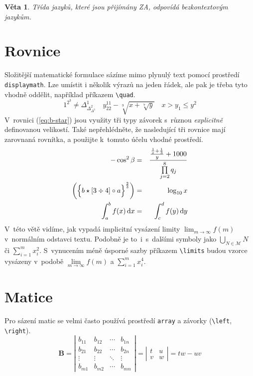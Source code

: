 \documentclass[a4paper, twocolumn, 11pt]{article}
\theoremstyle{plain}
\newtheorem{theorem}{Věta}
\begin{document}
\begin{theorem}

	Třída jazyků, které jsou přijímány ZA, odpovídá \emph{bezkontextovým jazykům.}

\end{theorem}

\section{Rovnice}

Složitější matematické formulace sázíme mimo plynulý text pomocí prostředí \texttt{displaymath}.
Lze umístit i několik výrazů na jeden řádek, ale pak je třeba tyto vhodně oddělit,
například příkazem \verb|\quad|.
%
\begin{displaymath}
	1^{2^3} \neq \Delta^1_{\Delta^2_{\Delta^3}} \quad
	y_{22}^{11} - \sqrt[9]{x + \sqrt[7]{y}} \quad
	x > y_1 \leq y^2
\end{displaymath}
%
\noindent
V~rovnici (\ref{eq:b-star}) jsou využity tři typy závorek s~různou \emph{explicitně} definovanou
velikostí. Také nepřehlédněte, že nasledující tři rovnice mají zarovnaná rovnítka, a použijte
k~tomuto účelu vhodné prostředí.
%
\begin{eqnarray}
	- \cos^2 \beta &=& \frac{\frac{\frac{1}{x} + \frac{1}{3}}{y} + 1000}{\prod\limits_{j=2}^8 q_j} \\
	\label{eq:b-star} \biggl( {\Bigl\{ b \star \left[ 3 \div 4 \right] \circ a \Bigr\}}^{\frac{2}{3}} \biggr) &=& \log_{10} x \\
	\label{eq:integ} \int_{a}^{b} f(x) \, \mathrm{d}x &=& \int_{c}^{d} f(y) \, \mathrm{d}y
\end{eqnarray}
%
\noindent
V~této větě vidíme, jak vypadá implicitní vysázení limity $\lim_{m\to\infty}f(m)$
v~normálním odstavci textu. Podobně je to~i~s~dalšími symboly jako
$\bigcup_{N \in \mathcal{M}} N$ či $\sum_{i=1}^{m} x_{i}^{2}$.
S~vynucením méně úsporné sazby příkazem \verb|\limits| budou vzorce vysázeny v~podobě
$\lim\limits_{m\to\infty} f(m)$ a $\sum\limits_{i=1}^{m} x_{i}^{4}$.

\section{Matice}

Pro sázení matic se velmi často používá prostředí \texttt{array}
a závorky (\verb|\left|, \verb|\right|).
%
\begin{displaymath}
	\mathbf{B} = \left| \begin{array}{cccc}
		b_{11} & b_{12} & \cdots & b_{1n} \\
		b_{21} & b_{22} & \cdots & b_{2n} \\
		\vdots & \vdots & \ddots & \vdots \\
		b_{m1} & b_{m2} & \cdots & b_{mn}
	\end{array} \right|
	= \left| \begin{array}{cc}
		t & u \\
		v & w
	\end{array} \right|
	= tw - uv
\end{displaymath}
\end{document}
